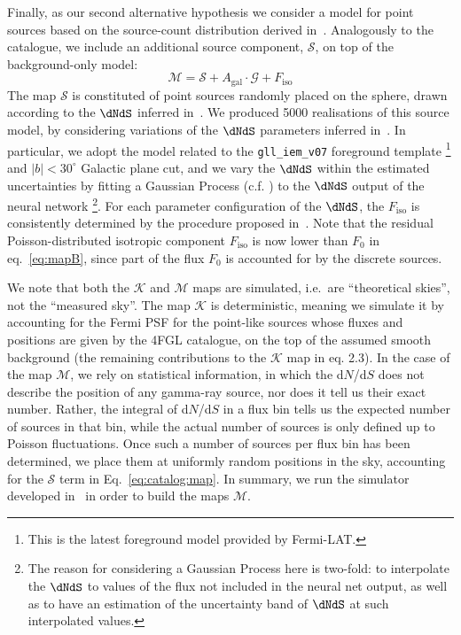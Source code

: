 \medskip
Finally,  as our second alternative hypothesis we consider a model for point sources based on the source-count distribution 
derived in~\cite{Amerio:2023uet}.
%
Analogously to the catalogue, we include an additional source component, $\mathcal{S}$, on top of the background-only model:
\begin{equation}
    \mathcal{M} = \mathcal{S} + A_\textrm{gal}\cdot\mathcal{G} + F_\textrm{iso}
    \label{eq:catalog:map}
\end{equation}
The map $\mathcal{S}$ is constituted of point sources randomly placed  on the sphere, drawn according to the $\dNdS$ inferred in~\cite{Amerio:2023uet}. 
We produced 5000 realisations of this source model, by considering variations of the 
$\dNdS$ parameters inferred in~\cite{Amerio:2023uet}. In particular, we adopt the model related to the \verb|gll_iem_v07| foreground template \footnote{This is the latest foreground model provided by Fermi-LAT.} and $|b|<30^\circ$ Galactic plane cut, and we vary the $\dNdS$ within the estimated uncertainties by fitting a Gaussian Process (c.f.  \cite{Rasmussen2005}) to the $\dNdS$  output of the neural network \footnote{The reason for considering a Gaussian Process here is two-fold: to interpolate the $\dNdS$ to values of the flux not included in the neural net output, as well as to have an estimation of the uncertainty band of $\dNdS$ at such interpolated values. }. 
For each parameter configuration of the $\dNdS$, the $F_\textrm{iso}$ is consistently determined by the procedure proposed in~\cite{Amerio:2023uet}.
Note that the residual Poisson-distributed isotropic component $F_\textrm{iso}$  is now lower than  $F_0$ in eq.~\eqref{eq:mapB}, since part of the flux $F_0$ is accounted for by the discrete sources. 

We note that both the $\mathcal{K}$ and $\mathcal{M}$ maps are simulated, i.e.~are ``theoretical skies'', not the ``measured sky''. The map $\mathcal{K}$ is deterministic, meaning we  simulate it by accounting for the Fermi PSF for the point-like sources whose fluxes and positions are given by the 4FGL catalogue, on the top of the assumed smooth background (the remaining contributions to the $\mathcal{K}$ map in eq. 2.3). In the case of the map $\mathcal{M}$, we rely on statistical information, in which the d$N$/d$S$ does not describe the position of any gamma-ray source, nor does it tell us their exact number. Rather, the integral of d$N$/d$S$ in a flux bin tells us the expected number of sources in that bin, while the actual number of sources is only defined up to Poisson fluctuations. Once such a number of sources per flux bin has been determined, we place them at uniformly random positions in the sky, accounting for the $\mathcal{S}$ term in Eq.~\eqref{eq:catalog:map}. In summary, we run the simulator developed in~\cite{Amerio:2023uet} in order to build the maps $\mathcal{M}$.



